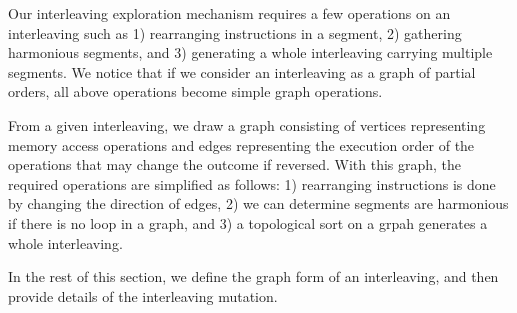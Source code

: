%
Our interleaving exploration mechanism requires a few operations on an
interleaving such as 1) rearranging instructions in a segment, 2)
gathering harmonious segments, and 3) generating a whole interleaving
carrying multiple segments.
%
We notice that if we consider an interleaving as a graph of partial
orders, all above operations become simple graph operations.

From a given interleaving, we draw a graph consisting of vertices
representing memory access operations and edges representing the
execution order of the operations that may change the outcome if
reversed.
%
With this graph, the required operations are simplified as follows: 1)
rearranging instructions is done by changing the direction of edges,
2) we can determine segments are harmonious if there is no loop in a
graph, and 3) a topological sort on a grpah generates a whole
interleaving.


In the rest of this section, we define the graph form of an
interleaving, and then provide details of the interleaving mutation.





